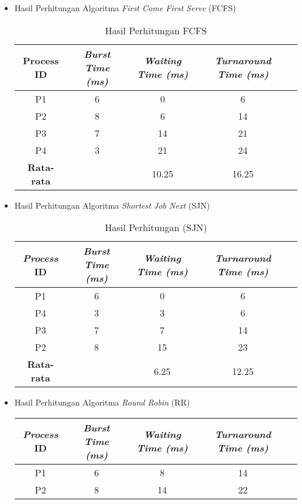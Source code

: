 \documentclass[12pt]{article}
\begin{document}
\begin{itemize}
    \item Hasil Perhitungan Algoritma \textit{First Come First Serve} (FCFS)
    \begin{table}[H]
    \centering
    \begin{tabular}{|c|c|c|c|c|}
    \hline
    \textbf{Process ID} & \textbf{\textit{Burst Time (ms)}} & \textbf{\textit{Waiting Time (ms)}} & \textbf{\textit{Turnaround Time (ms)}} \\ \hline
    P1 & 6 & 0 & 6 \\ \hline
    P2 & 8 & 6 & 14 \\ \hline
    P3 & 7 & 14 & 21 \\ \hline
    P4 & 3 & 21 & 24 \\ \hline
    \textbf{Rata-rata} &  & 10.25 & 16.25 \\ \hline
    \end{tabular}
    \caption{Hasil Perhitungan FCFS}
    \end{table}
    \item Hasil Perhitungan Algoritma \textit{Shortest Job Next} (SJN)
    \begin{table}[H]
    \centering
    \begin{tabular}{|c|c|c|c|c|}
    \hline
    \textbf{\textit{Process} ID} & \textbf{\textit{Burst Time (ms)}} & \textbf{\textit{Waiting Time (ms)}} & \textbf{\textit{Turnaround Time (ms)}} \\ \hline
    P1 & 6 & 0  & 6  \\ \hline
    P4 & 3 & 3  & 6  \\ \hline
    P3 & 7 & 7  & 14 \\ \hline
    P2 & 8 & 15 & 23 \\ \hline
    \textbf{Rata-rata} &  & 6.25 & 12.25 \\ \hline
    \end{tabular}
    \caption{Hasil Perhitungan (SJN)}
    \end{table}
    \item Hasil Perhitungan Algoritma \textit{Round Robin} (RR)
    \begin{table}[H]
    \centering
    \begin{tabular}{|c|c|c|c|c|}
    \hline
    \textbf{\textit{Process} ID} & \textbf{\textit{Burst Time (ms)}} & \textbf{\textit{Waiting Time (ms)}} & \textbf{\textit{Turnaround Time (ms)}} \\ \hline
    P1 & 6 & 8 & 14 \\ \hline
    P2 & 8 & 14 & 22 \\ \hline

\end{tabular}
\end{table}
\end{itemize}
\end{document}

